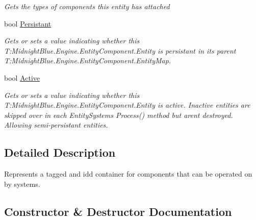 \begin{DoxyCompactItemize}
\begin{DoxyCompactList}\small\item\em Gets the types of components this entity has attached \end{DoxyCompactList}\item 
bool \hyperlink{class_midnight_blue_1_1_engine_1_1_entity_component_1_1_entity_af8d42e94328876a35a63032ed12a54c3}{Persistant}
\begin{DoxyCompactList}\small\item\em Gets or sets a value indicating whether this T\+:\+Midnight\+Blue.\+Engine.\+Entity\+Component.\+Entity is persistant in its parent T\+:\+Midnight\+Blue.\+Engine.\+Entity\+Component.\+Entity\+Map. \end{DoxyCompactList}\item 
bool \hyperlink{class_midnight_blue_1_1_engine_1_1_entity_component_1_1_entity_a746382aa60e12465f1d4df0523dbbf50}{Active}
\begin{DoxyCompactList}\small\item\em Gets or sets a value indicating whether this T\+:\+Midnight\+Blue.\+Engine.\+Entity\+Component.\+Entity is active. Inactive entities are skipped over in each Entity\+Systems Process() method but aren\textquotesingle{}t destroyed. Allowing semi-\/persistant entities. \end{DoxyCompactList}\end{DoxyCompactItemize}


\subsection{Detailed Description}
Represents a tagged and id\textquotesingle{}d container for components that can be operated on by systems. 



\subsection{Constructor \& Destructor Documentation}
\hypertarget{class_midnight_blue_1_1_engine_1_1_entity_component_1_1_entity_acf9a2caa0ea2a1d1a021d8b96e0f5821}{}\label{class_midnight_blue_1_1_engine_1_1_entity_component_1_1_entity_acf9a2caa0ea2a1d1a021d8b96e0f5821} 
